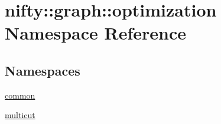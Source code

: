 \hypertarget{namespacenifty_1_1graph_1_1optimization}{}\section{nifty\+:\+:graph\+:\+:optimization Namespace Reference}
\label{namespacenifty_1_1graph_1_1optimization}
\subsection*{Namespaces}
\begin{DoxyCompactItemize}
\item 
 \hyperlink{namespacenifty_1_1graph_1_1optimization_1_1common}{common}
\item 
 \hyperlink{namespacenifty_1_1graph_1_1optimization_1_1multicut}{multicut}
\end{DoxyCompactItemize}
